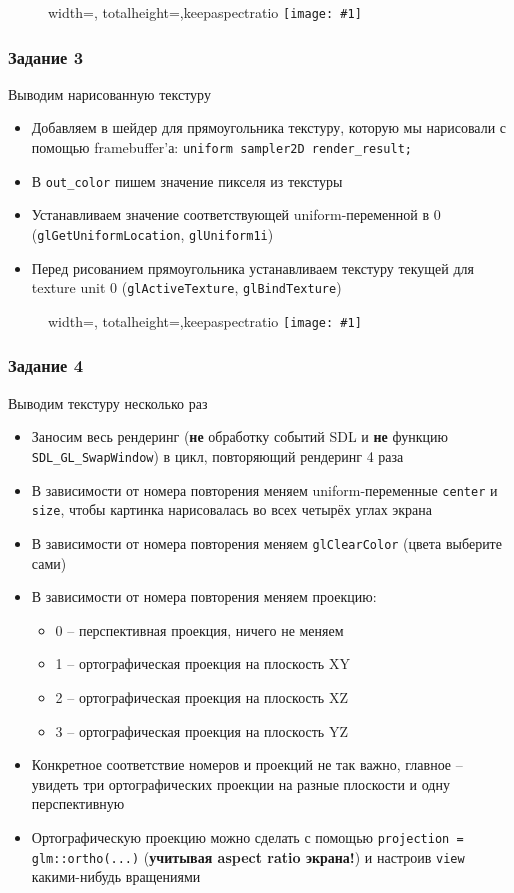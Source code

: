 \documentclass{beamer}
\newcommand{\slideimage}[1]{
  \begin{figure}
    \begin{adjustbox}{width=\textwidth, totalheight=\textheight-2\baselineskip-2\baselineskip,keepaspectratio}
      \texttt{[image: \#1]}
    \end{adjustbox}
  \end{figure}
}
\begin{document}
\begin{frame}[fragile]
\slideimage{2.png}
\end{frame}

\begin{frame}[fragile]
\frametitle{Задание 3}
Выводим нарисованную текстуру
\begin{itemize}
\item Добавляем в шейдер для прямоугольника текстуру, которую мы нарисовали с помощью framebuffer'а: \verb|uniform sampler2D render_result;|
\item В \verb|out_color| пишем значение пикселя из текстуры
\item Устанавливаем значение соответствующей uniform-переменной в 0 (\verb|glGetUniformLocation|, \verb|glUniform1i|)
\item Перед рисованием прямоугольника устанавливаем текстуру текущей для texture unit 0 (\verb|glActiveTexture|, \verb|glBindTexture|)
\end{itemize}
\end{frame}

\begin{frame}[fragile]
\slideimage{3.png}
\end{frame}

\begin{frame}[fragile]
\frametitle{Задание 4}
\fontsize{10pt}{10pt}
Выводим текстуру несколько раз
\begin{itemize}
\item Заносим весь рендеринг (\textbf{не} обработку событий SDL и \textbf{не} функцию \verb|SDL_GL_SwapWindow|) в цикл, повторяющий рендеринг 4 раза
\item В зависимости от номера повторения меняем uniform-переменные \verb|center| и \verb|size|, чтобы картинка нарисовалась во всех четырёх углах экрана
\item В зависимости от номера повторения меняем \verb|glClearColor| (цвета выберите сами)
\item В зависимости от номера повторения меняем проекцию:
\begin{itemize}
\item 0 -- перспективная проекция, ничего не меняем
\item 1 -- ортографическая проекция на плоскость XY
\item 2 -- ортографическая проекция на плоскость XZ
\item 3 -- ортографическая проекция на плоскость YZ
\end{itemize}
\item Конкретное соответствие номеров и проекций не так важно, главное -- увидеть три ортографических проекции на разные плоскости и одну перспективную
\item Ортографическую проекцию можно сделать с помощью \verb|projection = glm::ortho(...)| (\textbf{учитывая aspect ratio экрана!}) и настроив \verb|view| какими-нибудь вращениями
\end{itemize}
\end{frame}
\end{document}
